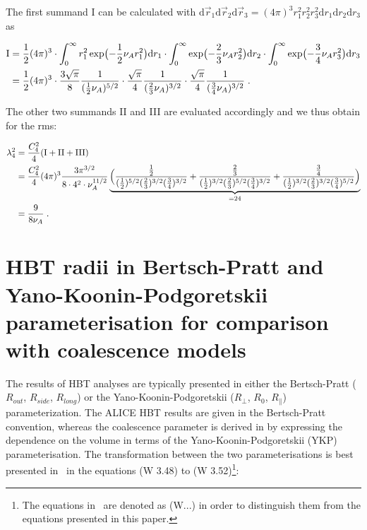 \documentclass[a4paper,11pt]{scrartcl}
\begin{document}
\begin{appendix}
\noindent The first summand I can be calculated with $\mathrm{d}\vec{r}_{1}\mathrm{d}\vec{r}_{2}\mathrm{d}\vec{r}_{3} = (4\pi)^3 r_1^2 r_2^2 r_3^2 \mathrm{d}r_{1}\mathrm{d}r_{2}\mathrm{d}r_{3}$ as

\begin{align}
 \mathrm{I} &= {1\over 2} (4\pi)^3 \cdot \int_{0}^{\infty} r_{1}^2 \exp\bigl(-{1\over2} \nu_A r_{1}^{2}\bigr)\mathrm{d}r_{1} \cdot \int_{0}^{\infty}\exp\bigl(-{2\over3} \nu_A r_{2}^{2}\bigr) \mathrm{d}r_{2} \cdot \int_{0}^{\infty} \exp\bigl(-{3\over4} \nu_A r_{3}^{2}\bigr) \mathrm{d}r_{3} \\
 	&= {1\over 2} (4\pi)^3 \cdot {3\sqrt{\pi} \over 8} {1 \over ({1\over 2} \nu_{A})^{5/2}} \cdot {\sqrt{\pi} \over 4} {1 \over ({2\over 3} \nu_{A})^{3/2}} \cdot {\sqrt{\pi} \over 4} {1 \over ({3\over 4} \nu_{A})^{3/2}} \;.
\end{align}

\noindent The other two summands II and III are evaluated accordingly and we thus obtain for the rms:

\begin{align}
	\lambda_{4}^{2} &= {C_4^2 \over 4} (\mathrm{I} + \mathrm{II} + \mathrm{III} ) \\
	&= {C_4^2 \over 4} (4\pi)^3 {3\pi^{3/2} \over 8 \cdot 4^2 \cdot \nu_A^{11/2}} \underbrace{\Bigl({{1\over2} \over ({1\over2})^{5/2}({2\over3})^{3/2}({3\over4})^{3/2} } +
	{{2\over3} \over ({1\over2})^{3/2}({2\over3})^{5/2}({3\over4})^{3/2} } + {{3\over4} \over ({1\over2})^{3/2}({2\over3})^{3/2}({3\over4})^{5/2} } \Bigr)}_{= 24} \\
	&= {9 \over 8 \nu_A} \;.
\end{align}

\newpage
\section{HBT radii in Bertsch-Pratt and Yano-Koonin-Podgoretskii parameterisation for comparison with coalescence models}\label{appendix:YKP}

The results of HBT analyses are typically presented in either the Bertsch-Pratt ($R_{out}$, $R_{side}$, $R_{long}$) or the Yano-Koonin-Podgoretskii ($R_{\perp}$, $R_{0}$, $R_{\parallel}$) parameterization. The ALICE HBT results \cite{Aamodt:2011mr, Adam:2015vna} are given in the Bertsch-Pratt convention, whereas the coalescence parameter is derived in \cite{Scheibl:1998tk} by expressing the dependence on the volume in terms of the Yano-Koonin-Podgoretskii (YKP) parameterisation. 
The transformation between the two parameterisations is best presented in~\cite{Wiedemann:1999qn} in the equations (W 3.48) to (W 3.52)\footnote{The equations in~\cite{Wiedemann:1999qn} are denoted as (W...) in order to distinguish them from the equations presented in this paper.}:


\end{appendix}
\end{document}
